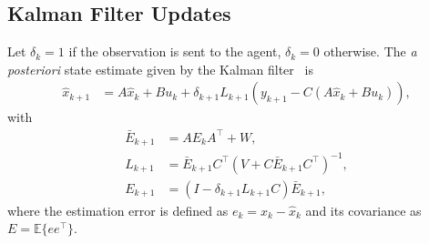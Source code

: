 \documentclass[letterpaper, 10 pt, conference]{ieeeconf}  %
\newcommand{\E}{\mathbb{E}}
\newcommand{\commvar}{\delta}
\newcommand{\MZ}[1]{\textcolor{cyan}{{#1}}}
\begin{document}
\subsection{Kalman Filter Updates}

Let $\delta_k =1$ if the observation is sent to the agent, $\delta_k =0$ otherwise.
The \emph{a posteriori} state estimate given by the Kalman filter~\cite{Sinopoli2004} is 
\begin{align}
\label{eq:kalman_estimate}
\hat x_{k+1} &= A \hat x_k + Bu_k + \delta_{k+1} L_{k+1} ( y_{k+1} - C(A\hat x_k +Bu_k)),
\end{align}
with %
\begin{subequations}
	\label{eq:kalman_upd}
	\begin{align}
		\bar E_{k+1} &= A E_k A^\top + W ,\\
		L_{k+1} &= \bar E_{k+1} C^\top\left ( V+C\bar E_{k+1} C^\top \right )^{-1}, \\
		E_{k+1} &= \left (I-\delta_{k+1} L_{k+1}C\right )\bar E_{k+1}, 	\label{eq:error_kalman_cov}
	\end{align}
\end{subequations}
where the estimation error is defined as $e_k=x_k-\hat x_k$ and its covariance as $E=\E\{ee^\top\}$.%
\end{document}
